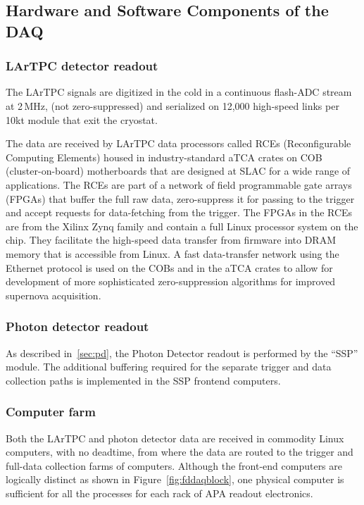 \subsection{Hardware and Software Components of the DAQ}
\subsubsection{LArTPC detector readout}

The LArTPC signals are digitized in the cold in a continuous flash-ADC stream at 2\,MHz, (not zero-suppressed)
and serialized on 12,000 high-speed links per 10kt module that exit the cryostat.

The data are received by LArTPC data processors called RCEs (Reconfigurable
Computing Elements) housed in industry-standard aTCA crates on COB (cluster-on-board)
motherboards that are designed at SLAC for a wide range of applications.  The RCEs are part of a
network of field programmable gate arrays (FPGAs) that buffer the full raw data,
zero-suppress it for passing to the trigger and accept requests for
data-fetching from the trigger.  The FPGAs in the RCEs are from the
Xilinx Zynq family and contain a full Linux processor system on the
chip.  They facilitate the high-speed data transfer from firmware into
DRAM memory that is accessible from Linux.  A fast data-transfer
network using the Ethernet protocol is used on the COBs and in the
aTCA crates to allow for development of more sophisticated zero-suppression algorithms
for improved supernova acquisition.

\subsubsection{Photon detector readout}

As described in~\ref{sec:pd}, the Photon Detector readout  is performed by the ``SSP'' module.
 The additional buffering required for the separate trigger and data collection paths
is implemented in the SSP frontend computers.

\subsubsection{Computer farm}
Both the LArTPC and photon detector data are
received in commodity Linux computers, with no deadtime, from where
the data are routed to the trigger and full-data collection farms of
computers.  Although the front-end computers are logically distinct as
shown in Figure~\ref{fig:fddaqblock}, one physical computer is
sufficient for all the processes for each rack of APA readout
electronics. 

